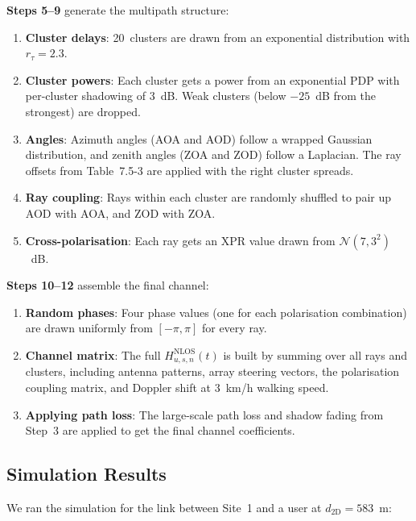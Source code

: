 \documentclass[10pt,a4paper,twocolumn]{article}
\begin{document}
\textbf{Steps 5--9} generate the multipath structure:
\begin{enumerate}[resume]
\item \textbf{Cluster delays}: 20~clusters are drawn from an exponential distribution with $r_\tau = 2.3$.
    \item \textbf{Cluster powers}: Each cluster gets a power from an exponential PDP with per-cluster shadowing of 3~dB. Weak clusters (below $-25$~dB from the strongest) are dropped.
    \item \textbf{Angles}: Azimuth angles (AOA and AOD) follow a wrapped Gaussian distribution, and zenith angles (ZOA and ZOD) follow a Laplacian. The ray offsets from Table~7.5-3 are applied with the right cluster spreads.
    \item \textbf{Ray coupling}: Rays within each cluster are randomly shuffled to pair up AOD with AOA, and ZOD with ZOA.
    \item \textbf{Cross-polarisation}: Each ray gets an XPR value drawn from $\mathcal{N}(7, 3^2)$~dB.
\end{enumerate}

\textbf{Steps 10--12} assemble the final channel:
\begin{enumerate}[resume]
\item \textbf{Random phases}: Four phase values (one for each polarisation combination) are drawn uniformly from $[-\pi, \pi]$ for every ray.
    \item \textbf{Channel matrix}: The full $H_{u,s,n}^{\text{NLOS}}(t)$ is built by summing over all rays and clusters, including antenna patterns, array steering vectors, the polarisation coupling matrix, and Doppler shift at 3~km/h walking speed.
    \item \textbf{Applying path loss}: The large-scale path loss and shadow fading from Step~3 are applied to get the final channel coefficients.
\end{enumerate}

\onecolumn
\subsection{Simulation Results}

We ran the simulation for the link between Site~1 and a user at $d_{\text{2D}} = 583$~m:
\end{document}
